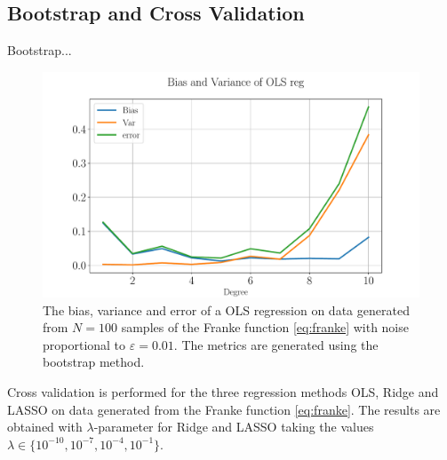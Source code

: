 \documentclass[%
reprint,
amsmath,amssymb,
aps,
pra,
]{revtex4-2}
\begin{document}
\subsection{Bootstrap and Cross Validation}
Bootstrap...
\begin{figure}[ht!]
	\centering
	\includegraphics[width=\linewidth]{Python/Figures/OLS/OLS_Bootstrap_BiasVar_no_scaling_GOOD.pdf}
	\caption{The bias, variance and error of a OLS regression on data generated from \(N=100\) samples of the Franke function \eqref{eq:franke} with noise proportional to \(\varepsilon=0.01\). The metrics are generated using the bootstrap method.}
	\label{fig:bootstrap}
\end{figure}

Cross validation is performed for the three regression methods OLS, Ridge and LASSO on data generated from the Franke function \eqref{eq:franke}. The results are obtained with \(\lambda\)-parameter for Ridge and LASSO taking the values \(\lambda \in\{ 10^{-10}, 10^{-7}, 10^{-4}, 10^{-1}\}\).
\end{document}
